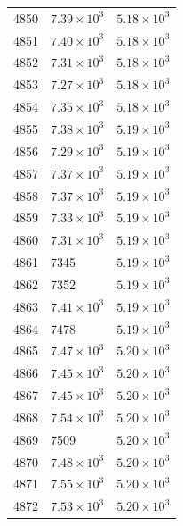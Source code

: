 \begin{table}[H]
\begin{tabular}{lll}
4850 & $\displaystyle 7.39 \times 10^{3}$ & $\displaystyle 5.18 \times 10^{3}$ \\
4851 & $\displaystyle 7.40 \times 10^{3}$ & $\displaystyle 5.18 \times 10^{3}$ \\
4852 & $\displaystyle 7.31 \times 10^{3}$ & $\displaystyle 5.18 \times 10^{3}$ \\
4853 & $\displaystyle 7.27 \times 10^{3}$ & $\displaystyle 5.18 \times 10^{3}$ \\
4854 & $\displaystyle 7.35 \times 10^{3}$ & $\displaystyle 5.18 \times 10^{3}$ \\
4855 & $\displaystyle 7.38 \times 10^{3}$ & $\displaystyle 5.19 \times 10^{3}$ \\
4856 & $\displaystyle 7.29 \times 10^{3}$ & $\displaystyle 5.19 \times 10^{3}$ \\
4857 & $\displaystyle 7.37 \times 10^{3}$ & $\displaystyle 5.19 \times 10^{3}$ \\
4858 & $\displaystyle 7.37 \times 10^{3}$ & $\displaystyle 5.19 \times 10^{3}$ \\
4859 & $\displaystyle 7.33 \times 10^{3}$ & $\displaystyle 5.19 \times 10^{3}$ \\
4860 & $\displaystyle 7.31 \times 10^{3}$ & $\displaystyle 5.19 \times 10^{3}$ \\
4861 & 7345 & $\displaystyle 5.19 \times 10^{3}$ \\
4862 & 7352 & $\displaystyle 5.19 \times 10^{3}$ \\
4863 & $\displaystyle 7.41 \times 10^{3}$ & $\displaystyle 5.19 \times 10^{3}$ \\
4864 & 7478 & $\displaystyle 5.19 \times 10^{3}$ \\
4865 & $\displaystyle 7.47 \times 10^{3}$ & $\displaystyle 5.20 \times 10^{3}$ \\
4866 & $\displaystyle 7.45 \times 10^{3}$ & $\displaystyle 5.20 \times 10^{3}$ \\
4867 & $\displaystyle 7.45 \times 10^{3}$ & $\displaystyle 5.20 \times 10^{3}$ \\
4868 & $\displaystyle 7.54 \times 10^{3}$ & $\displaystyle 5.20 \times 10^{3}$ \\
4869 & 7509 & $\displaystyle 5.20 \times 10^{3}$ \\
4870 & $\displaystyle 7.48 \times 10^{3}$ & $\displaystyle 5.20 \times 10^{3}$ \\
4871 & $\displaystyle 7.55 \times 10^{3}$ & $\displaystyle 5.20 \times 10^{3}$ \\
4872 & $\displaystyle 7.53 \times 10^{3}$ & $\displaystyle 5.20 \times 10^{3}$ \\

\end{tabular}
\end{table}
